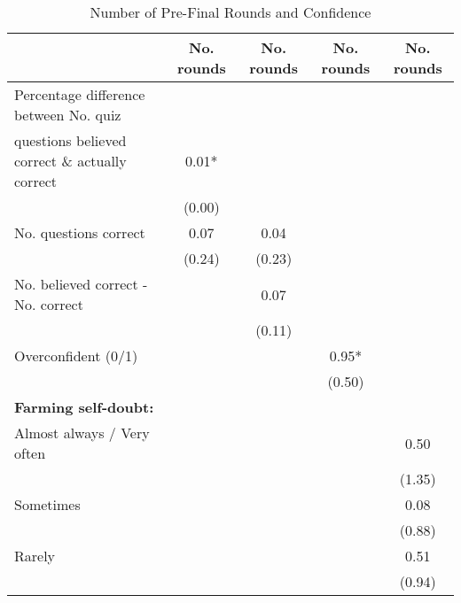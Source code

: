 \begin{table}[htbp]
\centering
\hspace*{-1.2cm}
\begin{threeparttable}
\small
\caption{Number of Pre-Final Rounds and Confidence}
\label{tab:B1}
\begin{tabular}{l cccc}
\hline
\hline
                    &\multicolumn{1}{c}{No. rounds}&\multicolumn{1}{c}{No. rounds}&\multicolumn{1}{c}{No. rounds}&\multicolumn{1}{c}{No. rounds}\\
\hline
Percentage difference between No. quiz&               &               &               &               \\
questions believed correct \& actually correct&        0.01*  &               &               &               \\
                    &      (0.00)   &               &               &               \\
No. questions correct&        0.07   &        0.04   &               &               \\
                    &      (0.24)   &      (0.23)   &               &               \\
No. believed correct - No. correct&               &        0.07   &               &               \\
                    &               &      (0.11)   &               &               \\
Overconfident (0/1) &               &               &        0.95*  &               \\
                    &               &               &      (0.50)   &               \\
\textbf{Farming self-doubt:}&               &               &               &               \\
Almost always / Very often&               &               &               &        0.50   \\
                    &               &               &               &      (1.35)   \\
Sometimes           &               &               &               &        0.08   \\
                    &               &               &               &      (0.88)   \\
Rarely              &               &               &               &        0.51   \\
                    &               &               &               &      (0.94)   \\

\end{tabular}
\end{threeparttable}
\end{table}
